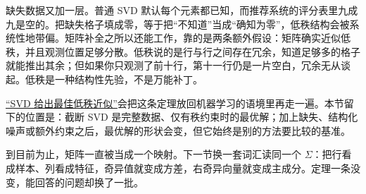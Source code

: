 缺失数据又加一层。普通 SVD 默认每个元素都已知，而推荐系统的评分表里九成九是空的。把缺失格子填成零，等于把``不知道''当成``确知为零''，低秩结构会被系统性地带偏。矩阵补全之所以还能工作，靠的是两条额外假设：矩阵确实近似低秩，并且观测位置足够分散。低秩说的是行与行之间存在冗余，知道足够多的格子就能推出其余；但如果你只观测了前十行，第十一行仍是一片空白，冗余无从谈起。低秩是一种结构性先验，不是万能补丁。

\hyperref[sec:13-Machine-Learning/04-Dimensionality-Reduction/02]{``SVD 给出最佳低秩近似''}会把这条定理放回机器学习的语境里再走一遍。本节留下的位置是：截断 SVD 是完整数据、仅有秩约束时的最优解；加上缺失、结构化噪声或额外约束之后，最优解的形状会变，但它始终是别的方法要比较的基准。

到目前为止，矩阵一直被当成一个映射。下一节换一套词汇读同一个 \(\Sigma\)：把行看成样本、列看成特征，奇异值就变成方差，右奇异向量就变成主成分。定理一条没变，能回答的问题却换了一批。
